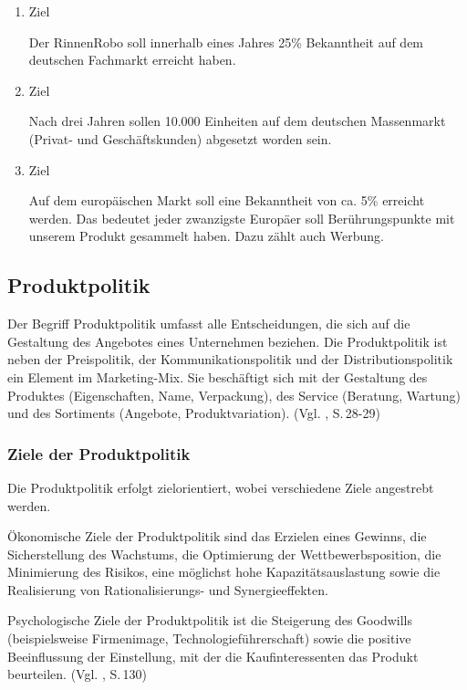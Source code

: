     \begin{enumerate}
        \item Ziel
        
            Der RinnenRobo soll innerhalb eines Jahres 25\% Bekanntheit auf dem deutschen Fachmarkt erreicht haben.

        \item Ziel
        
            Nach drei Jahren sollen 10.000 Einheiten auf dem deutschen Massenmarkt (Privat- und Geschäftskunden)
            abgesetzt worden sein.

        \item Ziel
        
            Auf dem europäischen Markt soll eine Bekanntheit von ca. 5\% erreicht werden. Das bedeutet jeder zwanzigste
            Europäer soll Berührungspunkte mit unserem Produkt gesammelt haben. Dazu zählt auch Werbung.
    \end{enumerate}


    \subsection{Produktpolitik} \label{ppoli}
    Der Begriff Produktpolitik umfasst alle Entscheidungen, die sich auf die Gestaltung des Angebotes eines Unternehmen
    beziehen. Die Produktpolitik ist neben der Preispolitik, der Kommunikationspolitik und der Distributionspolitik ein
    Element im Marketing-Mix. Sie beschäftigt sich mit der Gestaltung des Produktes (Eigenschaften, Name, Verpackung),
    des Service (Beratung, Wartung) und des Sortiments (Angebote, Produktvariation). (Vgl. \cite{Bruhn2012}, S.\,28-29)

    \subsubsection{Ziele der Produktpolitik}
        Die Produktpolitik erfolgt zielorientiert, wobei verschiedene Ziele angestrebt werden.

        Ökonomische Ziele der Produktpolitik sind das Erzielen eines Gewinns, die Sicherstellung des Wachstums, die
        Optimierung der Wettbewerbsposition, die Minimierung des Risikos, eine möglichst hohe Kapazitätsauslastung sowie
        die Realisierung von Rationalisierungs- und Synergieeffekten.

        Psychologische Ziele der Produktpolitik ist die Steigerung des Goodwills (beispielsweise Firmenimage,
        Technologieführerschaft) sowie die positive Beeinflussung der Einstellung, mit der die Kaufinteressenten das
        Produkt beurteilen. (Vgl. \cite{Bruhn2012}, S.\,130)

